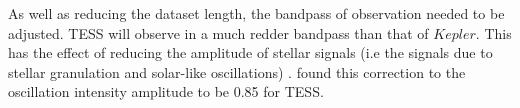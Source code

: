 \documentclass[a4paper,fleqn,usenatbib,useAMS]{mnras}
\newcommand{\kep}{\ensuremath{Kepler}\:}
\begin{document}

As well as reducing the dataset length, the bandpass of observation needed to be adjusted. TESS will observe in a much redder bandpass than that of \kep. This has the effect of reducing the amplitude of stellar signals (i.e the signals due to stellar granulation and solar-like oscillations) \citep{ballot_visibilities_2011}. \citet{campante_asteroseismic_2016} found this correction to the oscillation intensity amplitude to be 0.85 for TESS.
\end{document}
